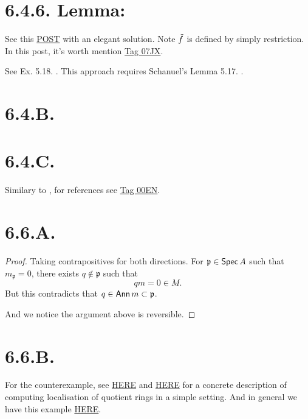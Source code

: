 \section{6.4.6. Lemma:}

See this \href{https://mathoverflow.net/questions/1788/does-finitely-presented-mean-always-finitely-presented-answered-yes}{POST} with an elegant solution. Note $\Tilde f$ is defined by simply restriction. In this post, it's worth mention \href{https://stacks.math.columbia.edu/tag/07JX}{Tag 07JX}.

See Ex. 5.18. \cite{altman2013term}. This approach requires Schanuel’s Lemma 5.17. \cite{altman2013term}.

\section{6.4.B.}\label{6.4.B.}

\section{6.4.C.}

Similary to , for references see \href{https://stacks.math.columbia.edu/tag/00EN}{Tag 00EN}.
\section{6.6.A.}
\begin{proof}
	Taking contrapositives for both directions. 
	For $\mathfrak p\in\operatorname{\mathsf{Spec}} A$ such that $m_{\mathfrak p}=0$, there exists $q\notin\mathfrak p$ such that 
	\[q m=0\in M.\] But this contradicts that $q\in \operatorname{\mathsf{Ann}} m\subset \mathfrak p$.

	And we notice the argument above is reversible.
\end{proof}
\section{6.6.B.}

For the counterexample, see \href{https://math.stackexchange.com/questions/111214/example-of-a-module-whose-support-is-not-closed}{HERE} and \href{https://math.stackexchange.com/questions/32381/localization-at-a-prime-ideal-in-mathbbz-6-mathbbz}{HERE} for a concrete description of computing localisation of quotient rings in a simple setting. And in general we have this example \href{https://math.stackexchange.com/questions/4852147/what-are-the-localizations-of-mathbbz-n-mathbbz-at-prime-ideals-in-genera}{HERE}.

